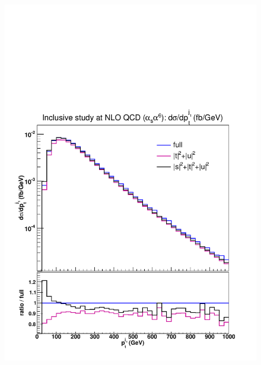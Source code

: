 \begin{figure}[hbt]
\centering
{\includegraphics[scale=0.35]{figures/scanfigures/ptj1_nlo.pdf}}

\end{figure}
